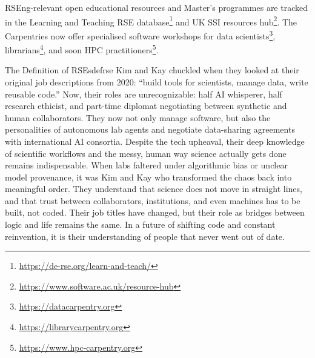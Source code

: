 \documentclass{eceasst}
\begin{document}
RSEng-relevant open educational resources and Master's programmes are tracked
in the Learning and Teaching RSE database\footnote{\url{https://de-rse.org/learn-and-teach/}}
and UK SSI resources hub\footnote{\url{https://www.software.ac.uk/resource-hub}}.
The Carpentries now offer specialised software workshops
for data scientists\footnote{\url{https://datacarpentry.org}},
librarians\footnote{\url{https://librarycarpentry.org}},
and soon HPC practitioners\footnote{\url{https://www.hpc-carpentry.org}}.

\begin{story}{The Definition of RSEs}{defrse}
Kim and Kay chuckled when they looked at their original job descriptions from 2020: ``build tools for scientists, manage data, write reusable code.''
Now, their roles are unrecognizable: half AI whisperer, half research ethicist, and part-time diplomat negotiating between synthetic and human collaborators.
They now not only manage software, but also the personalities of autonomous lab agents and negotiate data-sharing agreements with international AI consortia.
Despite the tech upheaval, their deep knowledge of scientific workflows and the messy, human way science actually gets done remains indispensable.
When labs faltered under algorithmic bias or unclear model provenance, it was Kim and Kay who transformed the chaos back into meaningful order.
They understand that science does not move in straight lines, and that trust between collaborators, institutions, and even machines has to be built, not coded.
Their job titles have changed, but their role as bridges between logic and life remains the same.
In a future of shifting code and constant reinvention, it is their understanding of people that never went out of date.

\end{story}
\end{document}
